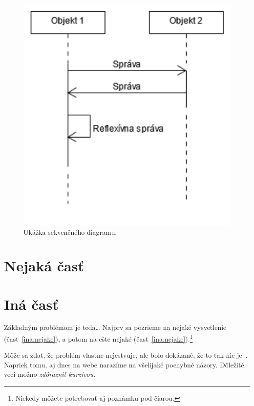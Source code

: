 \documentclass[10pt,twoside,slovak,a4paper]{article}
\begin{document}
\begin{figure}[tbh]
\centering
\includegraphics[scale=0.7]{seq_diagram.pdf}
\caption{Ukážka sekvenčného diagramu.}
\end{figure}

\section{Nejaká časť} \label{nejaka}





\section{Iná časť} \label{ina}

Základným problémom je teda\ldots{} Najprv sa pozrieme na nejaké vysvetlenie (časť~\ref{ina:nejake}), a potom na ešte nejaké (časť~\ref{ina:nejake}).\footnote{Niekedy môžete potrebovať aj poznámku pod čiarou.}

Môže sa zdať, že problém vlastne nejestvuje\cite{Coplien:MPD}, ale bolo dokázané, že to tak nie je~\cite{Czarnecki:Staged, Czarnecki:Progress}. Napriek tomu, aj dnes na webe narazíme na všelijaké pochybné názory\cite{PLP-Framework}. Dôležité veci možno \emph{zdôrazniť kurzívou}.
\end{document}
